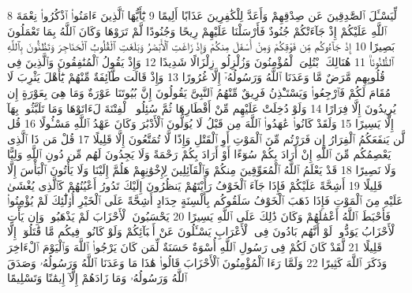{\tiny\colorbox{cl_aya}{8}} لِّيَسْـَٔلَ ٱلصَّٰدِقِينَ عَن صِدْقِهِمْ وَأَعَدَّ لِلْكَٰفِرِينَ عَذَابًا أَلِيمًا
{\tiny\colorbox{cl_aya}{9}} يَٰٓأَيُّهَا ٱلَّذِينَ ءَامَنُوا۟ ٱذْكُرُوا۟ نِعْمَةَ ٱللَّهِ عَلَيْكُمْ إِذْ جَآءَتْكُمْ جُنُودٌ فَأَرْسَلْنَا عَلَيْهِمْ رِيحًا وَجُنُودًا لَّمْ تَرَوْهَا وَكَانَ ٱللَّهُ بِمَا تَعْمَلُونَ بَصِيرًا
{\tiny\colorbox{cl_aya}{10}} إِذْ جَآءُوكُم مِّن فَوْقِكُمْ وَمِنْ أَسْفَلَ مِنكُمْ وَإِذْ زَاغَتِ ٱلْأَبْصَٰرُ وَبَلَغَتِ ٱلْقُلُوبُ ٱلْحَنَاجِرَ وَتَظُنُّونَ بِٱللَّهِ ٱلظُّنُونَا۠
{\tiny\colorbox{cl_aya}{11}} هُنَالِكَ ٱبْتُلِىَ ٱلْمُؤْمِنُونَ وَزُلْزِلُوا۟ زِلْزَالًا شَدِيدًا
{\tiny\colorbox{cl_aya}{12}} وَإِذْ يَقُولُ ٱلْمُنَٰفِقُونَ وَٱلَّذِينَ فِى قُلُوبِهِم مَّرَضٌ مَّا وَعَدَنَا ٱللَّهُ وَرَسُولُهُۥٓ إِلَّا غُرُورًا
{\tiny\colorbox{cl_aya}{13}} وَإِذْ قَالَت طَّآئِفَةٌ مِّنْهُمْ يَٰٓأَهْلَ يَثْرِبَ لَا مُقَامَ لَكُمْ فَٱرْجِعُوا۟ وَيَسْتَـْٔذِنُ فَرِيقٌ مِّنْهُمُ ٱلنَّبِىَّ يَقُولُونَ إِنَّ بُيُوتَنَا عَوْرَةٌ وَمَا هِىَ بِعَوْرَةٍ إِن يُرِيدُونَ إِلَّا فِرَارًا
{\tiny\colorbox{cl_aya}{14}} وَلَوْ دُخِلَتْ عَلَيْهِم مِّنْ أَقْطَارِهَا ثُمَّ سُئِلُوا۟ ٱلْفِتْنَةَ لَءَاتَوْهَا وَمَا تَلَبَّثُوا۟ بِهَآ إِلَّا يَسِيرًا
{\tiny\colorbox{cl_aya}{15}} وَلَقَدْ كَانُوا۟ عَٰهَدُوا۟ ٱللَّهَ مِن قَبْلُ لَا يُوَلُّونَ ٱلْأَدْبَٰرَ وَكَانَ عَهْدُ ٱللَّهِ مَسْـُٔولًا
{\tiny\colorbox{cl_aya}{16}} قُل لَّن يَنفَعَكُمُ ٱلْفِرَارُ إِن فَرَرْتُم مِّنَ ٱلْمَوْتِ أَوِ ٱلْقَتْلِ وَإِذًا لَّا تُمَتَّعُونَ إِلَّا قَلِيلًا
{\tiny\colorbox{cl_aya}{17}} قُلْ مَن ذَا ٱلَّذِى يَعْصِمُكُم مِّنَ ٱللَّهِ إِنْ أَرَادَ بِكُمْ سُوٓءًا أَوْ أَرَادَ بِكُمْ رَحْمَةً وَلَا يَجِدُونَ لَهُم مِّن دُونِ ٱللَّهِ وَلِيًّا وَلَا نَصِيرًا
{\tiny\colorbox{cl_aya}{18}} قَدْ يَعْلَمُ ٱللَّهُ ٱلْمُعَوِّقِينَ مِنكُمْ وَٱلْقَآئِلِينَ لِإِخْوَٰنِهِمْ هَلُمَّ إِلَيْنَا وَلَا يَأْتُونَ ٱلْبَأْسَ إِلَّا قَلِيلًا
{\tiny\colorbox{cl_aya}{19}} أَشِحَّةً عَلَيْكُمْ فَإِذَا جَآءَ ٱلْخَوْفُ رَأَيْتَهُمْ يَنظُرُونَ إِلَيْكَ تَدُورُ أَعْيُنُهُمْ كَٱلَّذِى يُغْشَىٰ عَلَيْهِ مِنَ ٱلْمَوْتِ فَإِذَا ذَهَبَ ٱلْخَوْفُ سَلَقُوكُم بِأَلْسِنَةٍ حِدَادٍ أَشِحَّةً عَلَى ٱلْخَيْرِ أُو۟لَٰٓئِكَ لَمْ يُؤْمِنُوا۟ فَأَحْبَطَ ٱللَّهُ أَعْمَٰلَهُمْ وَكَانَ ذَٰلِكَ عَلَى ٱللَّهِ يَسِيرًا
{\tiny\colorbox{cl_aya}{20}} يَحْسَبُونَ ٱلْأَحْزَابَ لَمْ يَذْهَبُوا۟ وَإِن يَأْتِ ٱلْأَحْزَابُ يَوَدُّوا۟ لَوْ أَنَّهُم بَادُونَ فِى ٱلْأَعْرَابِ يَسْـَٔلُونَ عَنْ أَنۢبَآئِكُمْ وَلَوْ كَانُوا۟ فِيكُم مَّا قَٰتَلُوٓا۟ إِلَّا قَلِيلًا
{\tiny\colorbox{cl_aya}{21}} لَّقَدْ كَانَ لَكُمْ فِى رَسُولِ ٱللَّهِ أُسْوَةٌ حَسَنَةٌ لِّمَن كَانَ يَرْجُوا۟ ٱللَّهَ وَٱلْيَوْمَ ٱلْءَاخِرَ وَذَكَرَ ٱللَّهَ كَثِيرًا
{\tiny\colorbox{cl_aya}{22}} وَلَمَّا رَءَا ٱلْمُؤْمِنُونَ ٱلْأَحْزَابَ قَالُوا۟ هَٰذَا مَا وَعَدَنَا ٱللَّهُ وَرَسُولُهُۥ وَصَدَقَ ٱللَّهُ وَرَسُولُهُۥ وَمَا زَادَهُمْ إِلَّآ إِيمَٰنًا وَتَسْلِيمًا
